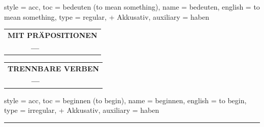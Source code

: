 \begin{verbentry}{
  style = {acc},
  toc = {bedeuten (to mean something)},
  name = {bedeuten},
  english = {to mean something},
  type = {regular, + Akkusativ},
  auxiliary = {haben}
}
\vspace{10pt}

\begin{tabular}{lll}
\multicolumn{3}{l}{\textbf{MIT PRÄPOSITIONEN}}\\
& \textbf{---} & \\
\end{tabular}
\hfill
\begin{tabular}{lll}
\multicolumn{3}{l}{\textbf{TRENNBARE VERBEN}}\\
& \textbf{---} & \\
\end{tabular}

\vspace{-5pt}
\end{verbentry}

\begin{verbentry}{
  style = {acc},
  toc = {beginnen (to begin)},
  name = {beginnen},
  english = {to begin},
  type = {irregular, + Akkusativ},
  auxiliary = {haben}
}
 
    
     \vspace{5pt}

    \hrule
    
    \vspace{5pt}


\end{verbentry}
